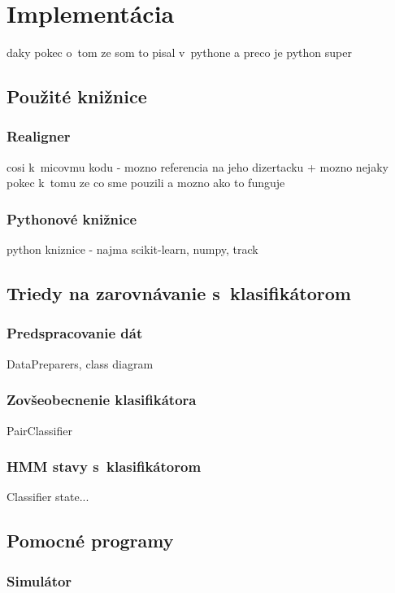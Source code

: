 \chapter{Implementácia}

\todo daky pokec o~tom ze som to pisal v~pythone a preco je python super

\section{Použité knižnice}

\subsection{Realigner}
\todo cosi k~micovmu kodu - mozno referencia na jeho dizertacku + mozno nejaky pokec k~tomu ze co sme pouzili a mozno ako to funguje

\subsection{Pythonové knižnice}
\todo python kniznice - najma scikit-learn, numpy, track

\section{Triedy na zarovnávanie s~klasifikátorom}

\subsection{Predspracovanie dát}

\todo DataPreparers, class diagram

\subsection{Zovšeobecnenie klasifikátora}

\todo PairClassifier

\subsection{HMM stavy s~klasifikátorom}

\todo Classifier state...

\section{Pomocné programy}
\subsection{Simulátor}

